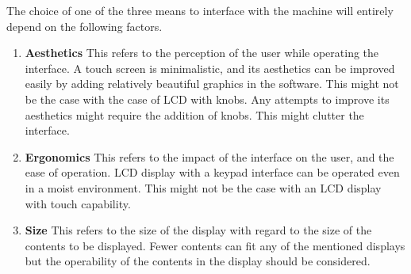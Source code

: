 The choice of one of the three means to interface with the machine will entirely depend on the following factors.

\begin{enumerate}
    \item \textbf{Aesthetics} \newline
    This refers to the perception of the user while operating the interface. A touch screen is minimalistic, and its aesthetics can be improved easily by adding relatively beautiful graphics in the software. This might not be the case with the case of LCD with knobs. Any attempts to improve its aesthetics might require the addition of knobs. This might clutter the interface.
    \item \textbf{Ergonomics} \newline
    This refers to the impact of the interface on the user, and the ease of operation. LCD display with a keypad interface can be operated even in a moist environment. This might not be the case with an LCD display with touch capability.    
    \item \textbf{Size}  \newline
    This refers to the size of the display with regard to the size of the contents to be displayed. Fewer contents can fit any of the mentioned displays but the operability of the contents in the display should be considered. 
\end{enumerate}